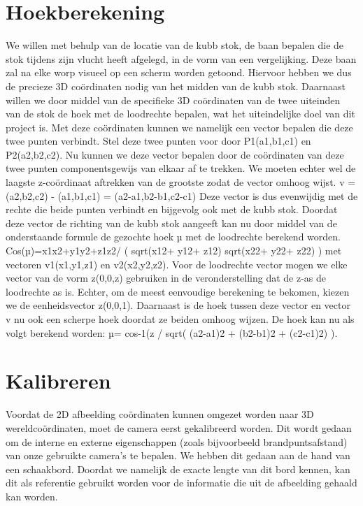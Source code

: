 \documentclass[kulak]{kulakarticle} %
\begin{document}
	\section{Hoekberekening}
	We willen met behulp van de locatie van de kubb stok, de baan bepalen die de stok tijdens zijn vlucht heeft afgelegd, in de vorm van een vergelijking. Deze baan zal na elke worp visueel op een scherm worden getoond. Hiervoor hebben we dus de precieze 3D coördinaten nodig van het midden van de kubb stok. Daarnaast willen we door middel van de specifieke 3D coördinaten van de twee uiteinden van de stok de hoek met de loodrechte bepalen, wat het uiteindelijke doel van dit project is. Met deze coördinaten kunnen we namelijk een vector bepalen die deze twee punten verbindt. Stel deze twee punten voor door P1(a1,b1,c1) en P2(a2,b2,c2). Nu kunnen we deze vector bepalen door de coördinaten van deze twee punten componentsgewijs van elkaar af te trekken. We moeten echter wel de laagste z-coördinaat aftrekken van de grootste zodat de vector omhoog wijst.
	v = (a2,b2,c2) - (a1,b1,c1) = (a2-a1,b2-b1,c2-c1)
	Deze vector is dus evenwijdig met de rechte die beide punten verbindt en bijgevolg ook met de kubb stok. Doordat deze vector de richting van de kubb stok aangeeft kan nu door middel van de onderstaande formule de gezochte hoek µ met de loodrechte berekend worden.
	Cos(µ)=x1x2+y1y2+z1z2/ ( sqrt(x12+ y12+ z12) sqrt(x22+ y22+ z22) )
	met vectoren v1(x1,y1,z1) en v2(x2,y2,z2).
	Voor de loodrechte vector mogen we elke vector van de vorm z(0,0,z) gebruiken in de veronderstelling dat de z-as de loodrechte as is. Echter, om de meest eenvoudige berekening te bekomen, kiezen we de eenheidsvector z(0,0,1). Daarnaast is de hoek tussen deze vector en vector v nu ook een scherpe hoek doordat ze beiden omhoog wijzen. De hoek kan nu als volgt berekend worden:
	µ= cos-1(z / sqrt( (a2-a1)2 + (b2-b1)2 + (c2-c1)2) ).


	\section{Kalibreren}
	Voordat de 2D afbeelding coördinaten kunnen omgezet worden naar 3D wereldcoördinaten, moet de camera eerst gekalibreerd worden. Dit wordt gedaan om de interne en externe eigenschappen (zoals bijvoorbeeld brandpuntsafstand) van onze gebruikte camera’s te bepalen.
	We hebben dit gedaan aan de hand van een schaakbord. Doordat we namelijk de exacte lengte van dit bord kennen, kan dit als referentie gebruikt worden voor de informatie die uit de afbeelding gehaald kan worden.
\end{document}
